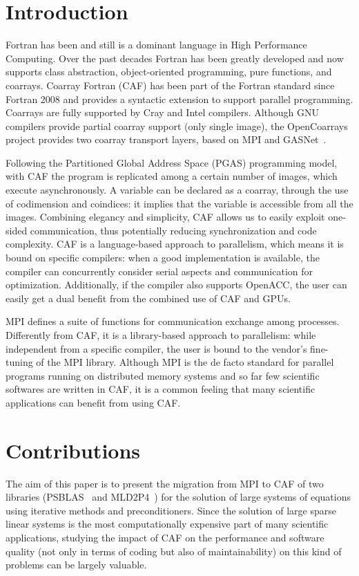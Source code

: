 \documentclass{IOS-Book-Article}
\begin{document}
\section{Introduction}
Fortran has been and still is a dominant language in High Performance Computing. Over the past decades Fortran has been greatly developed  and now supports class abstraction, object-oriented programming, pure functions, and coarrays. 
Coarray Fortran (CAF) has been part of the Fortran standard since Fortran 2008 and provides a syntactic extension %
to support parallel programming.  
Coarrays are fully supported by Cray and Intel compilers. Although GNU compilers provide partial coarray support  (only single image), 
the OpenCoarrays project provides two coarray transport layers, based on MPI and GASNet~\cite{PGAS14}.

Following the Partitioned Global Address Space (PGAS) programming model, with CAF the program is replicated among a certain number of images, which execute asynchronously. 
A variable can be declared as a coarray, through the use of codimension and coindices: it implies that the variable is accessible from all the images. 
Combining elegancy and simplicity, CAF allows us to easily exploit one-sided communication, thus potentially reducing synchronization and code complexity.
CAF is a language-based approach to parallelism, which means it is bound on specific compilers: when a good implementation is available, the compiler can concurrently consider serial aspects and communication for optimization. Additionally, if the compiler also supports OpenACC, the user can easily get a dual benefit from the combined use of CAF and GPUs.  

MPI %
defines a suite of functions for communication exchange among processes. 
Differently from CAF, it is a library-based approach to parallelism: %
while independent from a specific compiler, the user is bound to the vendor's fine-tuning of the MPI library.
Although MPI is the de facto standard for parallel programs running on distributed memory systems and so far few scientific softwares are written in CAF, 
it is a common feeling that many scientific applications can benefit from using CAF. 

\section{Contributions}

The aim of this paper is to present the migration from MPI to CAF of two libraries (PSBLAS~\cite{PSBLAS, PSBLAS3} and MLD2P4~\cite{mld-toms}) 
for the solution of large systems of equations using iterative methods and preconditioners. 
Since the solution of large sparse linear systems is the most computationally expensive part of many scientific applications, studying the impact of CAF on the performance 
and software quality (not only in terms of coding but also of maintainability) on this kind of problems can be largely valuable.
  
\end{document}
